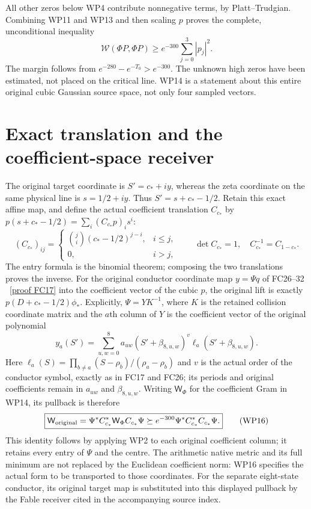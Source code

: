 \documentclass[11pt]{article}
\newcommand{\W}{\mathcal W}
\begin{document}
All other zeros below WP4 contribute nonnegative terms, by
Platt--Trudgian. Combining WP11 and WP13 and then scaling $p$
proves the complete, unconditional inequality
\[
 \boxed{\W(\Phi P,\Phi P)\ge e^{-300}\sum_{j=0}^3|p_j|^2.}
                                                                  \tag{WP14}
\]
The margin follows from $e^{-280}-e^{-T_0}>e^{-300}$.
The unknown high zeros have been estimated, not placed on the
critical line. WP14 is a statement about this entire original
cubic Gaussian source space, not only four sampled vectors.

\section{Exact translation and the coefficient-space receiver}
The original target coordinate is $S'=c_*+iy$, whereas the
zeta coordinate on the same physical line is $s=1/2+iy$.
Thus $S'=s+c_*-1/2$. Retain this exact affine map, and define
the actual coefficient translation $C_{c_*}$ by
$p(s+c_*-1/2)=\sum_i(C_{c_*}p)_i s^i$:
\[
 (C_{c_*})_{ij}=\begin{cases}\binom ji(c_*-1/2)^{j-i},&i\le j,\\
                  0,&i>j,\end{cases}\qquad
 \det C_{c_*}=1,\quad C_{c_*}^{-1}=C_{1-c_*}.                \tag{WP15}
\]
The entry formula is the binomial theorem; composing the two
translations proves the inverse. For the original conductor
coordinate map $y=\Psi q$ of FC26--32 \cite{FC}%
~\href{https://github.com/KokunoYumeto/zeta-function-research-reader/blob/5992ad50c0f2a06921f1fcaded7b4e38097c0739/workbenches/splitzero-tandem/continuations/20260920-original-kernel-mixed-determinants/providers/FABLE_TO_ORIGINAL_CONDUCTOR.tex\#L300}{[proof FC17]}%
{} into the coefficient vector of the
cubic $p$, the original lift is exactly $p(D+c_*-1/2)\phi_*$.
Explicitly, $\Psi=YK^{-1}$, where $K$ is the retained collision
coordinate matrix and the $a$th column of $Y$ is the coefficient
vector of the original polynomial
\[
 y_a(S')=\sum_{u,w=0}^{8}a_{uw}
          (S'+\beta_{8,u,w})^v\ell_a(S'+\beta_{8,u,w}).
\]
Here $\ell_a(S)=\prod_{b\ne a}(S-\rho_b)/(\rho_a-\rho_b)$
and $v$ is the actual order of the conductor symbol, exactly as
in FC17 and FC26; its periods and original coefficients remain
in $a_{uw}$ and $\beta_{8,u,w}$.
Writing $\mathsf W_\Phi$ for the coefficient Gram in WP14,
its pullback is therefore
\[
 \boxed{\mathsf W_{\rm original}
  =\Psi^*C_{c_*}^*\mathsf W_\Phi C_{c_*}\Psi
  \succeq e^{-300}\Psi^*C_{c_*}^*C_{c_*}\Psi.}              \tag{WP16}
\]
This identity follows by applying WP2 to each original
coefficient column; it retains every entry of $\Psi$ and the
centre. The arithmetic native metric and its full minimum are
not replaced by the Euclidean coefficient norm: WP16 specifies
the actual form to be transported to those coordinates.
For the separate eight-state conductor, its original target map
is substituted into this displayed pullback by the Fable
receiver cited in the accompanying source index.
\end{document}
